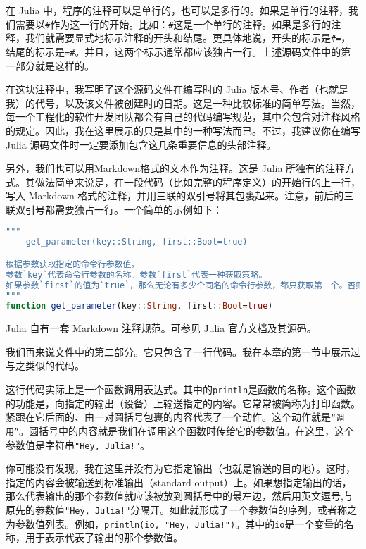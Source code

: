 在 Julia 中，程序的注释可以是单行的，也可以是多行的。如果是单行的注释，我们需要以\verb|#|作为这一行的开始。比如：\verb|#|这是一个单行的注释。如果是多行的注释，我们就需要显式地标示注释的开头和结尾。更具体地说，开头的标示是\verb|#=|，结尾的标示是\verb|=#|。并且，这两个标示通常都应该独占一行。上述源码文件中的第一部分就是这样的。

在这块注释中，我写明了这个源码文件在编写时的 Julia 版本号、作者（也就是我）的代号，以及该文件被创建时的日期。这是一种比较标准的简单写法。当然，每一个工程化的软件开发团队都会有自己的代码编写规范，其中会包含对注释风格的规定。因此，我在这里展示的只是其中的一种写法而已。不过，我建议你在编写 Julia 源码文件时一定要添加包含这几条重要信息的头部注释。

另外，我们也可以用Markdown格式的文本作为注释。这是 Julia 所独有的注释方式。其做法简单来说是，在一段代码（比如完整的程序定义）的开始行的上一行，写入 Markdown 格式的注释，并用三联的双引号将其包裹起来。注意，前后的三联双引号都需要独占一行。一个简单的示例如下：

\begin{lstlisting}[language=julia]
"""
    get_parameter(key::String, first::Bool=true)

根据参数获取指定的命令行参数值。
参数`key`代表命令行参数的名称。参数`first`代表一种获取策略。
如果参数`first`的值为`true`，那么无论有多少个同名的命令行参数，都只获取第一个。否则只获取最后一个。
"""
function get_parameter(key::String, first::Bool=true)
\end{lstlisting}

Julia 自有一套 Markdown 注释规范。可参见 Julia 官方文档及其源码。

我们再来说文件中的第二部分。它只包含了一行代码。我在本章的第一节中展示过与之类似的代码。

这行代码实际上是一个函数调用表达式。其中的\verb|println|是函数的名称。这个函数的功能是，向指定的输出（设备）上输送指定的内容。它常常被简称为打印函数。紧跟在它后面的、由一对圆括号包裹的内容代表了一个动作。这个动作就是\verb|“调用”|。圆括号中的内容就是我们在调用这个函数时传给它的参数值。在这里，这个参数值是字符串\verb|"Hey, Julia!"|。

你可能没有发现，我在这里并没有为它指定输出（也就是输送的目的地）。这时，指定的内容会被输送到标准输出（standard output）上。如果想指定输出的话，那么代表输出的那个参数值就应该被放到圆括号中的最左边，然后用英文逗号,与原先的参数值\verb|"Hey, Julia!"|分隔开。如此就形成了一个参数值的序列，或者称之为参数值列表。例如，\verb|println(io, "Hey, Julia!")|。其中的\verb|io|是一个变量的名称，用于表示代表了输出的那个参数值。

